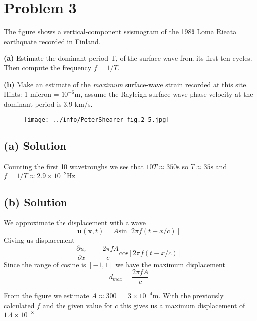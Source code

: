 \section*{Problem 3}
The figure shows a vertical-component seismogram of the 1989 Loma Rieata earthquate recorded in Finland. 

\textbf{(a)} Estimate the dominant period T, of the surface wave from its first ten cycles. Then compute the frequency $f = 1/T$.

\textbf{(b)} Make an estimate of the \textit{maximum} surface-wave strain recorded at this site. Hints: 1 micron = $10^{-6}$m, assume the Rayleigh surface wave phase velocity at the dominant period is 3.9 km/s.

\begin{figure}[H]
    \centering
    \texttt{[image: ../info/PeterShearer\_fig.2\_5.jpg]}
\end{figure}


\subsection*{(a) Solution}
Counting the first 10 wavetroughs we see that $10T \approx 350\text{s}$ so $T \approx 35 \text{s}$ and $f = 1/T \approx 2.9\times 10^{-2}\text{Hz}$

\subsection*{(b) Solution}

We approximate the displacement with a wave 
\begin{equation*}
    \mathbf{u}(\mathbf{x}, t) = A\text{sin}[2\pi f (t - x/c)]
\end{equation*}
Giving us displacement
\begin{equation*}
    \frac{\partial u_z}{\partial x}=\frac{-2\pi fA}{c}\text{cos}[2\pi f(t-x/c)]
\end{equation*}
Since the range of cosine is $[-1,1]$ we have the maximum displacement
\begin{equation*}
    d_{max} = \frac{2\pi fA}{c}
\end{equation*}

From the figure we estimate $A \approx 300$   $= 3 \times 10^{-4}\text{m}$. With the previously calculated $f$ and the given value for $c$ this gives us a maximum displacement of $1.4\times10^{-8}$